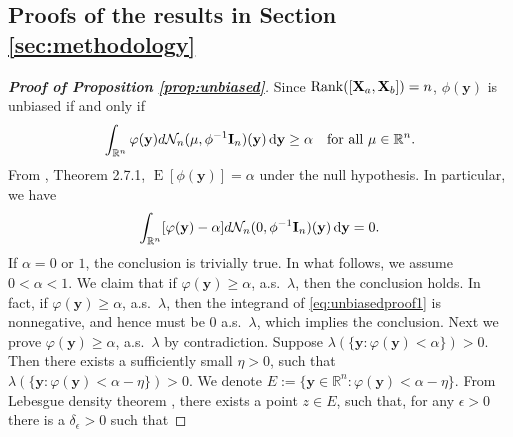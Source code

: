 \documentclass[11pt]{article}
\DeclareMathOperator{\myRank}{Rank}
\DeclareMathOperator{\myE}{E}
\newcommand{\By}{\mathbf{y}}    \newcommand{\Bz}{\mathbf{z}}
\theoremstyle{plain}
\theoremstyle{definition}
\theoremstyle{remark}
\begin{document}




\begin{appendices}

    \section{Proofs of the results in Section \ref{sec:methodology}}

\begin{proof}[\textbf{Proof of Proposition \ref{prop:unbiased}}]
    Since $\myRank([\BX_a,\BX_b])=n$, $\phi(\By)$ is unbiased if and only if
    \begin{equation*}
        \int_{\mathbb R^n} \varphi(\By) d\mathcal N_n (\mu,\phi^{-1} \BI_n) (\By) \,\mathrm{d} \By\geq \alpha
        \quad \text{for all } \mu\in \mathbb R^n.
    \end{equation*}
    From \cite{Lehmann}, Theorem 2.7.1, $\myE [\phi(\By)]=\alpha$ under the null hypothesis.
    In particular,
    we have
    \begin{equation}\label{eq:unbiasedproof1}
        \int_{\mathbb R^n} [\varphi(\By)-\alpha] d\mathcal N_n (0,\phi^{-1} \BI_n)(\By) \,\mathrm{d} \By=0.
    \end{equation}
    If $\alpha=0$ or $1$, the conclusion is trivially true.
    In what follows, we assume $0<\alpha<1$.
    We claim that if $\varphi(\By) \geq \alpha$, a.s.\ $\lambda$, then the conclusion holds.
    In fact, if $\varphi(\By) \geq \alpha$, a.s.\ $\lambda$,
    then the integrand of \eqref{eq:unbiasedproof1} is nonnegative, and hence must be $0$ a.s.\ $\lambda$, which implies the conclusion. 
    Next we prove $\varphi(\By) \geq \alpha$, a.s.\ $\lambda$ by contradiction. Suppose $\lambda(\{\By:\varphi (\By) <\alpha\})>0$.
    Then there exists a sufficiently small $\eta >0$, such that $\lambda(\{\By:\varphi (\By) <\alpha-\eta\})>0$.
    We denote $ E:=\{\By\in \mathbb R^n:\varphi (\By) <\alpha-\eta\}$.
    From Lebesgue density theorem \citep[Corollary 6.2.6]{book:992991}, there exists a point $z\in  E$, such that, for any $\epsilon >0$ there is a $\delta_{\epsilon}>0$ such that

\end{proof}
\end{appendices}
\end{document}
